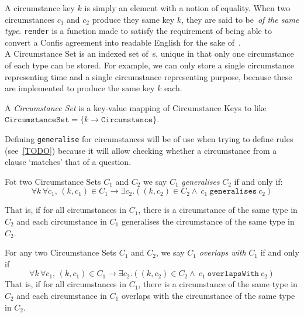 A circumstance key $k$ is simply an element with a notion of equality.
When two circumstances $c_1$ and $c_2$ produce they same key $k$, they are said to be~\emph{of the same type}.
\texttt{render} is a function made to satisfy the requirement of being able to convert a Confis agreement into readable English for the sake of~.\\

A Circumstance Set is an indexed set of~s, unique in that only one circumstance of each type can be stored.
For example, we can only store a single circumstance representing time and a single circumstance representing purpose, because these are implemented to produce the same key $k$ each.

\begin{definition}
    \label{def:circumstanceSet}
    A \emph{Circumstance Set} is a key-value mapping of Circumstance Keys to  like $\texttt{CircumstanceSet} = \{ k \to \texttt{Circumstance} \}$.
\end{definition}

Defining \texttt{generalise} for circumstances will be of use when trying to define rules (see~\autoref{TODO}) because it will allow checking whether a circumstance from a clause `matches' that of a question.

\begin{definition}
    Fot two Circumstance Sets $C_1$ and $C_2$ we say $C_1$ \emph{generalises} $C_2$ if and only if:
    \begin{equation}
        \label{eq:circumstanceSet:generalisation}
        \forall k \, \forall c_1, \, (k, c_1) \in C_1 \to
        \exists c_2.((k, c_2) \in C_2  \land\ c_1\ \texttt{generalises}\ c_2)
    \end{equation}

    That is, if for all circumstances in $C_1$, there is a circumstance of the same type in $C_2$ and each circumstance in $C_1$ generalises the circumstance of the same type in $C_2$.
\end{definition}

\begin{definition}
    For any two Circumstance Sets $C_1$ and $C_2$, we say $C_1$ \emph{overlaps with} $C_1$ if and only if
    \begin{equation}
        \label{eq:circumstanceSet:overlap}
        \forall k \, \forall c_1, \, (k, c_1) \in C_1 \to
        \exists c_2.((k, c_2) \in C_2  \land\ c_1\ \texttt{overlapsWith}\ c_2)
    \end{equation}
    That is, if for all circumstances in $C_1$, there is a circumstance of the same type in $C_2$ and each circumstance in $C_1$ overlaps with the circumstance of the same type in $C_2$.
\end{definition}

